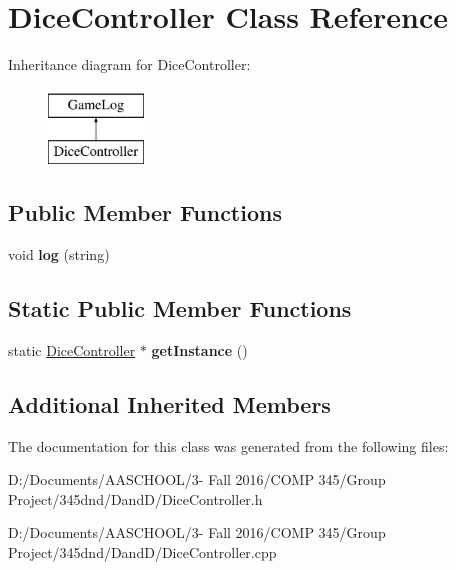\hypertarget{class_dice_controller}{}\section{Dice\+Controller Class Reference}
\label{class_dice_controller}
Inheritance diagram for Dice\+Controller\+:\begin{figure}[H]
\begin{center}
\leavevmode
\includegraphics[height=2.000000cm]{class_dice_controller}
\end{center}
\end{figure}
\subsection*{Public Member Functions}
\begin{DoxyCompactItemize}
\item 
\hypertarget{class_dice_controller_a69a47281781771e6d7ed485b1c200915}{}\label{class_dice_controller_a69a47281781771e6d7ed485b1c200915} 
void {\bfseries log} (string)
\end{DoxyCompactItemize}
\subsection*{Static Public Member Functions}
\begin{DoxyCompactItemize}
\item 
\hypertarget{class_dice_controller_a59fa09f4ea25e2f5ba81a53381c13d1a}{}\label{class_dice_controller_a59fa09f4ea25e2f5ba81a53381c13d1a} 
static \hyperlink{class_dice_controller}{Dice\+Controller} $\ast$ {\bfseries get\+Instance} ()
\end{DoxyCompactItemize}
\subsection*{Additional Inherited Members}


The documentation for this class was generated from the following files\+:\begin{DoxyCompactItemize}
\item 
D\+:/\+Documents/\+A\+A\+S\+C\+H\+O\+O\+L/3-\/ Fall 2016/\+C\+O\+M\+P 345/\+Group Project/345dnd/\+Dand\+D/Dice\+Controller.\+h\item 
D\+:/\+Documents/\+A\+A\+S\+C\+H\+O\+O\+L/3-\/ Fall 2016/\+C\+O\+M\+P 345/\+Group Project/345dnd/\+Dand\+D/Dice\+Controller.\+cpp\end{DoxyCompactItemize}
